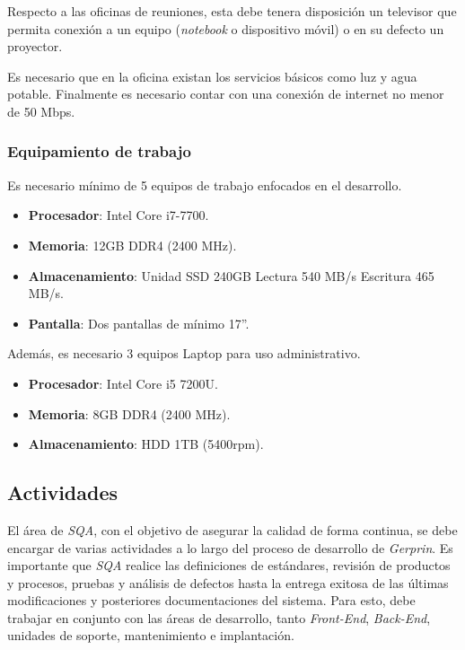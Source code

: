 Respecto a las oficinas de reuniones, esta debe tenera disposición un televisor que permita conexión a un equipo (\emph{notebook} o dispositivo móvil) o en su defecto un proyector.

Es necesario que en la oficina existan los servicios básicos como luz y agua potable. Finalmente es necesario contar con una conexión de internet no menor de 50 Mbps.

\subsubsection{Equipamiento de trabajo}

Es necesario mínimo de 5 equipos de trabajo enfocados en el desarrollo.

	\begin{itemize}
		\item 
		\textbf{Procesador}: Intel Core i7-7700.
		\item 
		\textbf{Memoria}: 12GB DDR4 (2400 MHz).
		\item 
		\textbf{Almacenamiento}: Unidad SSD 240GB Lectura 540 MB/s Escritura 465 MB/s.
		\item 
		\textbf{Pantalla}: Dos pantallas de mínimo 17”.
	\end{itemize}

Además, es necesario  3 equipos Laptop para uso administrativo. 

	\begin{itemize}
		\item 
		\textbf{Procesador}: Intel Core i5 7200U.
		\item 
		\textbf{Memoria}: 8GB DDR4 (2400 MHz).
		\item 
		\textbf{Almacenamiento}: HDD 1TB (5400rpm).
	\end{itemize}

\subsection{Actividades}

El área de \emph{SQA}, con el objetivo de asegurar la calidad de forma continua, se debe encargar de varias actividades a lo largo del proceso de desarrollo de \emph{Gerprin}. Es importante que \emph{SQA} realice las definiciones de estándares, revisión de productos y procesos, pruebas y análisis de defectos hasta la entrega exitosa de las últimas modificaciones y posteriores documentaciones del sistema. Para esto, debe trabajar en conjunto con las áreas de desarrollo, tanto \emph{Front-End}, \emph{Back-End}, unidades de soporte, mantenimiento e implantación.

